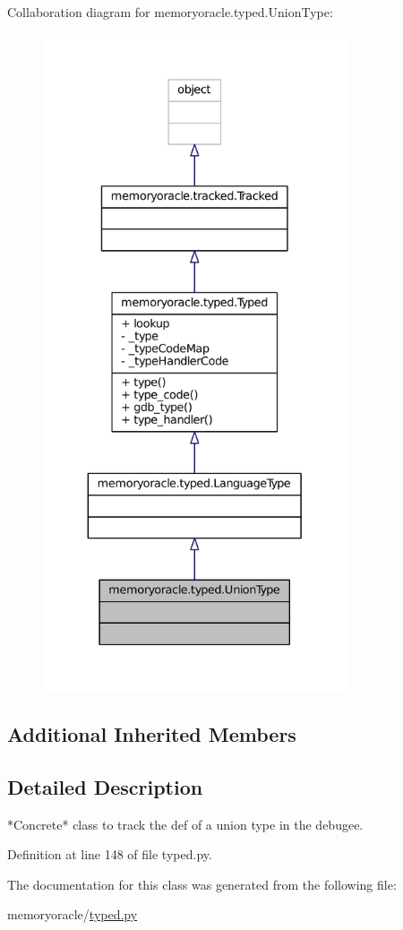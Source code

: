 Collaboration diagram for memoryoracle.\+typed.\+Union\+Type\+:\nopagebreak
\begin{figure}[H]
\begin{center}
\leavevmode
\includegraphics[height=550pt]{classmemoryoracle_1_1typed_1_1UnionType__coll__graph}
\end{center}
\end{figure}
\subsection*{Additional Inherited Members}


\subsection{Detailed Description}
\begin{DoxyVerb}*Concrete* class to track the def of a union type in the debugee.
\end{DoxyVerb}
 

Definition at line 148 of file typed.\+py.



The documentation for this class was generated from the following file\+:\begin{DoxyCompactItemize}
\item 
memoryoracle/\hyperlink{typed_8py}{typed.\+py}\end{DoxyCompactItemize}
